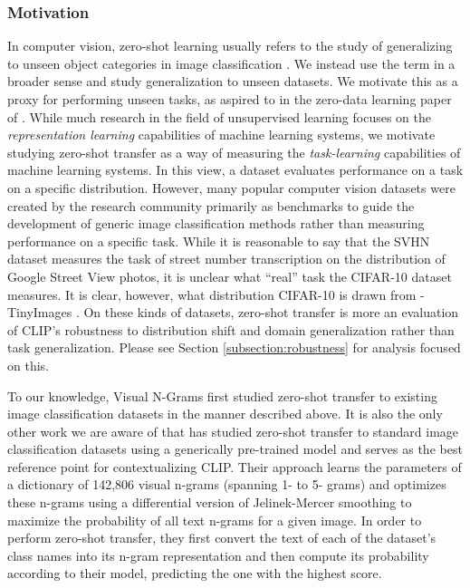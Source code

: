 \subsubsection{Motivation}

In computer vision, zero-shot learning usually refers to the study of generalizing to unseen object categories in image classification \citep{lampert2009learning}. We instead use the term in a broader sense and study generalization to unseen datasets. We motivate this as a proxy for performing unseen tasks, as aspired to in the zero-data learning paper of \citet{larochelle2008zero}. While much research in the field of unsupervised learning focuses on the \textit{representation learning} capabilities of machine learning systems, we motivate studying zero-shot transfer as a way of measuring the \textit{task-learning} capabilities of machine learning systems. In this view, a dataset evaluates performance on a task on a specific distribution. However, many popular computer vision datasets were created by the research community primarily as benchmarks to guide the development of generic image classification methods rather than measuring performance on a specific task. While it is reasonable to say that the SVHN dataset measures the task of street number transcription on the distribution of Google Street View photos, it is unclear what ``real'' task the CIFAR-10 dataset measures. It is clear, however, what distribution CIFAR-10 is drawn from - TinyImages \citep{torralba200880}. On these kinds of datasets, zero-shot transfer is more an evaluation of CLIP's robustness to distribution shift and domain generalization rather than task generalization. Please see Section \ref{subsection:robustness} for analysis focused on this.

To our knowledge, Visual N-Grams \citep{li2017learning} first studied zero-shot transfer to existing image classification datasets in the manner described above. It is also the only other work we are aware of that has studied zero-shot transfer to standard image classification datasets using a generically pre-trained model and serves as the best reference point for contextualizing CLIP. Their approach learns the parameters of a dictionary of 142,806 visual n-grams (spanning 1- to 5- grams) and optimizes these n-grams using a differential version of Jelinek-Mercer smoothing to maximize the probability of all text n-grams for a given image. In order to perform zero-shot transfer, they first convert the text of each of the dataset's class names into its n-gram representation and then compute its probability according to their model, predicting the one with the highest score.

